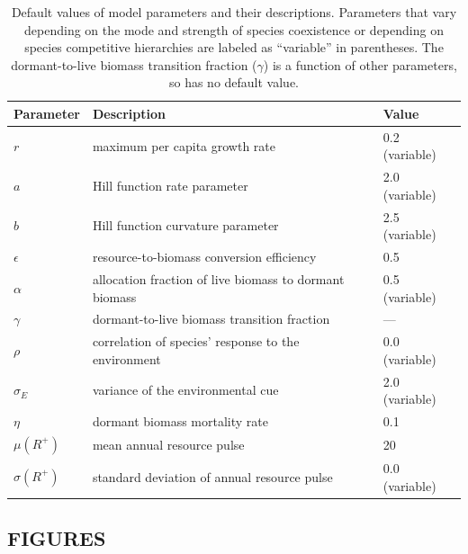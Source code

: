 \documentclass[12pt,]{article}
\begin{document}
\begin{table}[!htbp]
\caption{Default values of model parameters and their descriptions. Parameters that vary depending on the mode and strength of species coexistence or depending on species competitive hierarchies are labeled as ``variable'' in parentheses. The dormant-to-live biomass transition fraction ($\gamma$) is a function of other parameters, so has no default value.}
\begin{tabular}{l l l}
\hline
Parameter & Description & Value \\
\hline
$r$ & maximum per capita growth rate & 0.2 (variable) \\
$a$ & Hill function rate parameter & 2.0 (variable) \\
$b$ & Hill function curvature parameter & 2.5 (variable) \\
$\epsilon$ & resource-to-biomass conversion efficiency & 0.5 \\
$\alpha$ & allocation fraction of live biomass to dormant biomass & 0.5 (variable) \\
$\gamma$ & dormant-to-live biomass transition fraction & --- \\
$\rho$ & correlation of species' response to the environment & 0.0 (variable) \\
$\sigma_E$ & variance of the environmental cue & 2.0 (variable) \\
$\eta$ & dormant biomass mortality rate & 0.1 \\
$\mu(R^+)$ & mean annual resource pulse & 20 \\
$\sigma(R^+)$ & standard deviation of annual resource pulse & 0.0 (variable) \\
\hline
\end{tabular}
\end{table}

\newpage{}

\subsection{FIGURES}\label{figures}
\end{document}
